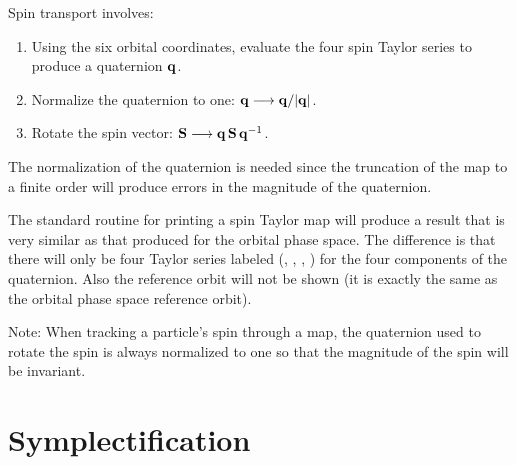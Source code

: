 Spin transport involves:
\begin{enumerate}[itemsep=-0.6ex, topsep=-0.9ex]
\item Using the six orbital coordinates, evaluate the four spin Taylor series to produce a quaternion ${\bf q}$.
\item Normalize the quaternion to one: ${\bf q} \longrightarrow {\bf q}/|{\bf q}|$.
\item Rotate the spin vector: ${\bf S} \longrightarrow {\bf q} \, {\bf S} \, {\bf q}^{-1}$.
\end{enumerate}
The  normalization of the quaternion is needed since the truncation of the map to a finite order will produce errors
in the magnitude of the quaternion.

The standard \bmad routine for printing a spin Taylor map will produce a result that is very similar
as that produced for the orbital phase space. The difference is that there will only be four Taylor
series labeled (, , , ) for the four components of the quaternion. Also the reference orbit
will not be shown (it is exactly the same as the orbital phase space reference orbit).

Note: When tracking a particle's spin through a map, the quaternion used to rotate the spin is
always normalized to one so that the magnitude of the spin will be invariant.

\section{Symplectification}
\label{s:symp.method}

